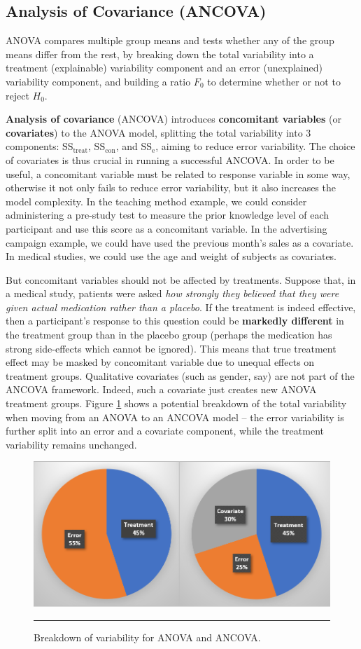 \subsection{Analysis of Covariance (ANCOVA)}
ANOVA compares multiple group means and tests whether any of the group means differ from the rest, by breaking down the total variability into a treatment (explainable) variability component and an error (unexplained) variability component, and building a ratio $F_0$ to determine whether or not to reject $H_{0}$. \par \textbf{Analysis of covariance} (ANCOVA) introduces \textbf{concomitant variables} (or \textbf{covariates}) to the ANOVA model, splitting the total variability into 3 components: $\text{SS}_{\textrm{treat}}$, $\text{SS}_{\textrm{con}}$, and $\text{SS}_{\textrm{e}}$, aiming to reduce error variability. The choice of covariates is thus crucial in running a successful ANCOVA.
\newl In order to be useful, a concomitant variable must be related to response variable in some way, otherwise it not only fails to reduce error variability, but it also increases the model complexity. In the teaching method example, we could consider administering a pre-study test to measure the prior knowledge level of each participant and use this score as a concomitant variable. In the advertising campaign example, we could have used the previous month's sales as a covariate. In medical studies, we could use the age and weight of subjects as covariates.
\par But concomitant variables should not be affected by treatments. Suppose that, in a medical study, patients were asked \textit{how strongly they believed that they were given actual medication rather than a placebo}. If the treatment is indeed effective, then a participant's response to this question could be \textbf{markedly different} in the treatment group than in the  placebo group (perhaps the medication has strong side-effects which cannot be ignored). This means that true treatment effect may be masked by concomitant variable due to unequal effects on treatment groups.
\newl Qualitative covariates (such as gender, say) are not part of the ANCOVA framework. Indeed, such a covariate just creates new ANOVA treatment groups. \newl Figure \ref{fig:testA14} shows a potential breakdown of the total variability when moving from an ANOVA to an ANCOVA model -- the error variability is further split into an error and a covariate component, while the treatment variability remains unchanged.
\begin{figure}[!t]
\centering
  \includegraphics[width=0.6\linewidth]{Images/testA14.png}
  \caption[\small Breakdown of variability for ANOVA and ANCOVA]{\small Breakdown of variability for ANOVA and ANCOVA.}
  \label{fig:testA14}\hrule
\end{figure}
\afterpage{\FloatBarrier}
